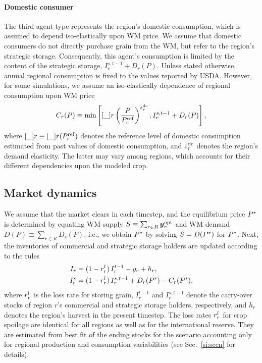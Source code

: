 \paragraph*{Domestic consumer}
The third agent type represents the region's domestic consumption, which is assumed to depend
iso-elastically upon WM price. We assume that domestic consumers do not directly purchase grain from
the WM, but refer to the region's strategic storage. Consequently, this agent's consumption is
limited by the content of the strategic storage, $I_r^{s,t-1}+D_r(P)$. Unless stated otherwise,
annual regional consumption is fixed to the values reported by USDA. However, for some simulations,
we assume an iso-elastically dependence of regional consumption upon WM price
\begin{equation}
  \label{eq:C_r}
 C_r(P)\equiv \min\left[\Cref_r\left(\frac{P}{\Pref_r} \right)^{\dce_r},I_r^{s,t-1}+D_r(P)\right],
\end{equation}
where $\Cref_r\equiv\Cref_r(\Pref_r)$ denotes the reference level of domestic consumption estimated
from past values of domestic consumption, and $\varepsilon^{\operatorname{dc}}_r$ denotes the region's demand elasticity. The
latter may vary among regions, which accounts for their different dependencies upon the modeled
crop.

\subsection{Market dynamics}
\label{si:market_dyn}
We assume that the market clears in each timestep, and the equilibrium price $P^{*}$ is determined by
equating WM supply $S\equiv \sum_{r\in R} \boldsymbol y_r^{\operatorname{opt}}$ and WM demand $D(P)\equiv \sum_{r\in R}D_r(P)$,
i.e., we obtain $P^{*}$ by solving $S=D(P^{*})$ for $P^{*}$. Next, the inventories of commercial and
strategic storage holders are updated according to the rules
\begin{align}
  \label{eq:stor_update}
  I_r &= (1-r^l_r)\,I_r^{t-1} -y_r + h_r, \\
  I^s_r &= (1-r^l_r)\,I_r^{s,t-1} + D_r(P^{*})-C_r(P^{*}),
\end{align}
where $r^l_r$ is the loss rate for storing grain, $I_r^{t-1}$ and $I_r^{s,t-1}$ denote the
carry-over stocks of region $r$'s commercial and strategic storage holders, respectively, and $h_r$
denotes the region's harvest in the present timestep. The loss rates $r^l_r$ for crop spoilage are
identical for all regions as well as for the international reserve. They are estimated from best fit
of the ending stocks for the scenario accounting only for regional production and consumption
variabilities (see Sec.~\ref{si:scen} for details).

